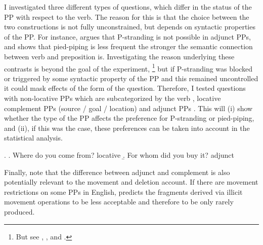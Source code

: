 I investigated three different types of questions, which differ in the status of the PP with respect to the verb. The reason for this is that the choice between the two constructions is not fully unconstrained, but depends on syntactic properties of the PP. For instance, \citet[26]{vanriemsdijk1978} argues that P-stranding is not possible in adjunct PPs, and \citet{nykiel2017} shows that pied-piping is less frequent the stronger the semantic connection between verb and preposition is. Investigating the reason underlying these contrasts is beyond the goal of the experiment,%
% 
\footnote{But see \citet{vanriemsdijk1978}, \citet{chomsky1981}, \citet{pullum.huddleston2002} and \citet{nykiel2017}.}\afterfn%
%
but if P-stranding was blocked or triggered by some syntactic property of the PP and this remained uncontrolled it could mask effects of the form of the question. Therefore, I tested questions with non-locative PPs which are subcategorized by the verb \LLast, locative complement PPs (source / goal / location) \Next[a] and adjunct PPs \Next[b]. This will (i) show whether the type of the PP affects the preference for P-stranding or pied-piping, and (ii), if this was the case, these preferences can be taken into account in the statistical analysis.

\ex. \a. Where do you come from? \hfill locative
     \b. For whom did you buy it? \hfill adjunct

Finally, note that the difference between adjunct and complement is also potentially relevant to the movement and deletion account. If there are movement restrictions on some PPs in English, \citet{merchant2004} predicts the fragments derived via illicit movement operations to be less acceptable and therefore to be only rarely produced.

